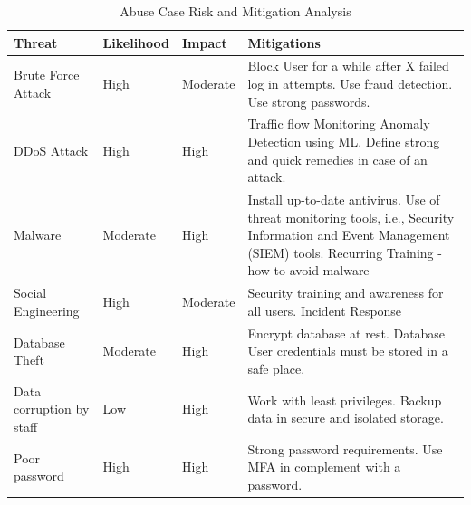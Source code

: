 \begingroup
\centering
\setlength{\tabcolsep}{6.5pt} %
\renewcommand{\arraystretch}{1.8} %
\begin{longtable}{ |p{3cm}|p{3cm}|p{3cm}| p{5cm} |}
 \caption{Abuse Case Risk and Mitigation Analysis}
    \label{table:abuse_case}
 \hline
 \textbf{Threat} & \textbf{Likelihood} & \textbf{Impact} & \textbf{Mitigations} \\ [0.5ex] 
 \hline
 Brute Force Attack & High & Moderate &  Block User for a while after X failed log in attempts.\newline
 Use fraud detection. \newline
 Use strong passwords.
 \citep[p.~682-683]{herley2008protecting}\\
 \hline
 DDoS Attack & High & High & Traffic flow Monitoring\newline
  Anomaly Detection using ML. \newline
  Define strong and quick remedies in case of an attack.
 \citep[p.~1]{DDOS}\\
\hline
   Malware & Moderate & High & Install up-to-date antivirus.\newline
   Use of threat monitoring tools, i.e., Security Information and Event Management (SIEM) tools.\newline
 Recurring Training - how to avoid malware  
  \\
 \hline
 Social Engineering & High & Moderate & Security training and awareness for all users.\newline
 Incident Response \citep[p.~ 13-17]{chantler2008social}
  \\
  \hline
   Database Theft & Moderate & High & Encrypt database at rest.\newline
  Database User credentials must be stored in a safe place.
  \\
  \hline 
     Data corruption by staff & Low & High & Work with least privileges.\newline
  Backup data in secure and isolated storage.
  \\
  \hline
       Poor password & High & High &Strong password requirements.\newline
       Use MFA in complement with a password.
  \\
  \hline

\end{longtable}
\endgroup


